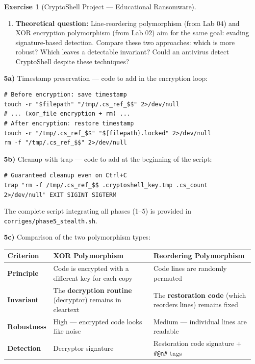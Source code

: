 \documentclass[a4paper,11pt]{article}
\theoremstyle{plain}
\theoremstyle{definition}
\newtheorem{exercice}{Exercise}
\begin{document}
\begin{exercice}[CryptoShell Project --- Educational Ransomware]
\begin{enumerate}
\item[\textbf{5c)}] \textbf{Theoretical question:} Line-reordering polymorphism (from Lab 04) and XOR encryption polymorphism (from Lab 02) aim for the same goal: evading signature-based detection. Compare these two approaches: which is more robust? Which leaves a detectable invariant? Could an antivirus detect CryptoShell despite these techniques?
\end{enumerate}

\begin{correction}

\textbf{5a)} Timestamp preservation --- code to add in the encryption loop:
\begin{lstlisting}[title=Timestamp preservation (5a)]
# Before encryption: save timestamp
touch -r "$filepath" "/tmp/.cs_ref_$$" 2>/dev/null
# ... (xor_file encryption + rm) ...
# After encryption: restore timestamp
touch -r "/tmp/.cs_ref_$$" "${filepath}.locked" 2>/dev/null
rm -f "/tmp/.cs_ref_$$" 2>/dev/null
\end{lstlisting}

\textbf{5b)} Cleanup with trap --- code to add at the beginning of the script:
\begin{lstlisting}[title=Cleanup with trap (5b)]
# Guaranteed cleanup even on Ctrl+C
trap "rm -f /tmp/.cs_ref_$$ .cryptoshell_key.tmp .cs_count 2>/dev/null" EXIT SIGINT SIGTERM
\end{lstlisting}

The complete script integrating all phases (1--5) is provided in \texttt{corriges/phase5\_stealth.sh}.

\medskip
\textbf{5c)} Comparison of the two polymorphism types:

\begin{center}
\begin{tabular}{lp{5cm}p{5cm}}
\toprule
\textbf{Criterion} & \textbf{XOR Polymorphism} & \textbf{Reordering Polymorphism} \\
\midrule
\textbf{Principle} & Code is encrypted with a different key for each copy & Code lines are randomly permuted \\
\textbf{Invariant} & The \textbf{decryption routine} (decryptor) remains in cleartext & The \textbf{restoration code} (which reorders lines) remains fixed \\
\textbf{Robustness} & High --- encrypted code looks like noise & Medium --- individual lines are readable \\
\textbf{Detection} & Decryptor signature & Restoration code signature + \texttt{\#@n\#} tags \\
\bottomrule
\end{tabular}
\end{center}


\end{correction}
\end{exercice}
\end{document}
